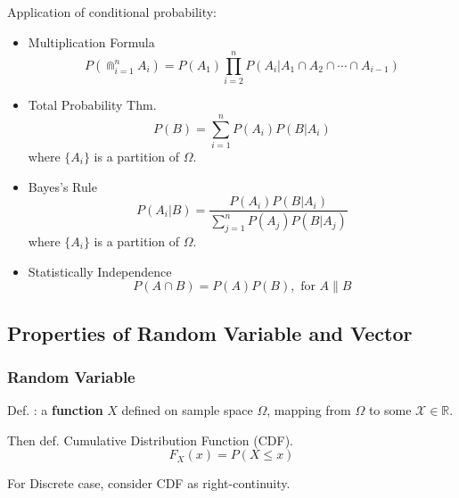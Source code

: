         Application of conditional probability:
        \begin{itemize}
        \item Multiplication Formula
        \begin{equation}    
            P(\Cap_{i=1}^n A_i)=P(A_1)\prod_{i=2}^n P(A_i|A_1\cap A_2\cap \cdots\cap A_{i-1})    
        \end{equation}
        \item Total Probability Thm.
        \begin{equation}    
            P(B)=\sum_{i=1}^n P(A_i)P(B|A_i)  
        \end{equation}
        where $\{A_i\}$ is a partition of $\Omega$.
        \item Bayes's Rule
        \begin{equation}    
            P(A_i|B)=\frac{P(A_i)P(B|A_i)}{\sum_{j=1}^nP(A_j)P(B|A_j)}    
        \end{equation}
        where $\{A_i\}$ is a partition of $\Omega$.
        \item Statistically Independence
        \begin{equation}    
            P(A\cap B) =P(A)P(B),\text{ for }A\parallel B
        \end{equation}
    \end{itemize}

\subsection{Properties of Random Variable and Vector}\label{SectionPropertiesOfRandomVariableAndVector}

\subsubsection{Random Variable}
    Def. : a \textbf{function} $X$ defined on sample space $\Omega$, mapping from $\Omega$ to some $\mathscr{X}\in\mathbb{R} $.

    Then def. Cumulative Distribution Function (CDF).
    \begin{equation}
        F_X(x)=P(X\leq x)
    \end{equation}

    For Discrete case, consider CDF as right-continuity.

